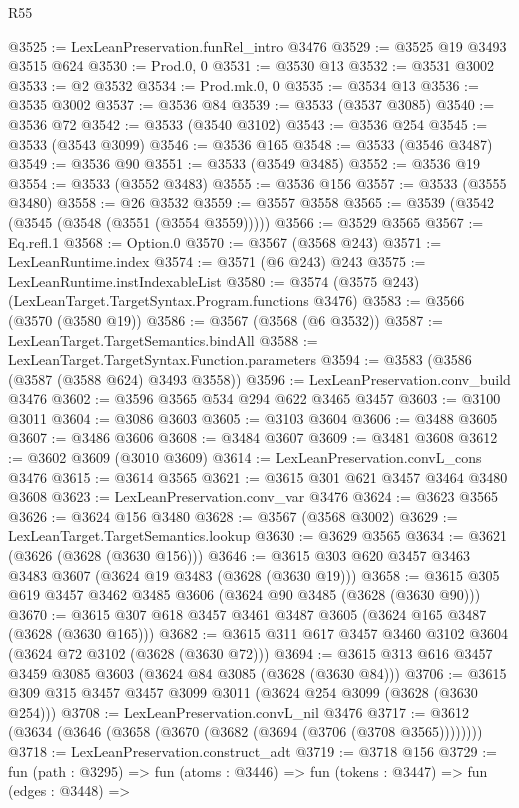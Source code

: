 \begin{lexlean}{R55}
\begin{coremodule}
@3525 := LexLeanPreservation.funRel_intro @3476
@3529 := @3525 @19 @3493 @3515 @624
@3530 := Prod.{0, 0}
@3531 := @3530 @13
@3532 := @3531 @3002
@3533 := @2 @3532
@3534 := Prod.mk.{0, 0}
@3535 := @3534 @13
@3536 := @3535 @3002
@3537 := @3536 @84
@3539 := @3533 (@3537 @3085)
@3540 := @3536 @72
@3542 := @3533 (@3540 @3102)
@3543 := @3536 @254
@3545 := @3533 (@3543 @3099)
@3546 := @3536 @165
@3548 := @3533 (@3546 @3487)
@3549 := @3536 @90
@3551 := @3533 (@3549 @3485)
@3552 := @3536 @19
@3554 := @3533 (@3552 @3483)
@3555 := @3536 @156
@3557 := @3533 (@3555 @3480)
@3558 := @26 @3532
@3559 := @3557 @3558
@3565 := @3539 (@3542 (@3545 (@3548 (@3551 (@3554 @3559)))))
@3566 := @3529 @3565
@3567 := Eq.refl.{1}
@3568 := Option.{0}
@3570 := @3567 (@3568 @243)
@3571 := LexLeanRuntime.index
@3574 := @3571 (@6 @243) @243
@3575 := LexLeanRuntime.instIndexableList
@3580 := @3574 (@3575 @243) (LexLeanTarget.TargetSyntax.Program.functions @3476)
@3583 := @3566 (@3570 (@3580 @19))
@3586 := @3567 (@3568 (@6 @3532))
@3587 := LexLeanTarget.TargetSemantics.bindAll
@3588 := LexLeanTarget.TargetSyntax.Function.parameters
@3594 := @3583 (@3586 (@3587 (@3588 @624) @3493 @3558))
@3596 := LexLeanPreservation.conv_build @3476
@3602 := @3596 @3565 @534 @294 @622 @3465 @3457
@3603 := @3100 @3011
@3604 := @3086 @3603
@3605 := @3103 @3604
@3606 := @3488 @3605
@3607 := @3486 @3606
@3608 := @3484 @3607
@3609 := @3481 @3608
@3612 := @3602 @3609 (@3010 @3609)
@3614 := LexLeanPreservation.convL_cons @3476
@3615 := @3614 @3565
@3621 := @3615 @301 @621 @3457 @3464 @3480 @3608
@3623 := LexLeanPreservation.conv_var @3476
@3624 := @3623 @3565
@3626 := @3624 @156 @3480
@3628 := @3567 (@3568 @3002)
@3629 := LexLeanTarget.TargetSemantics.lookup
@3630 := @3629 @3565
@3634 := @3621 (@3626 (@3628 (@3630 @156)))
@3646 := @3615 @303 @620 @3457 @3463 @3483 @3607 (@3624 @19 @3483 (@3628 (@3630 @19)))
@3658 := @3615 @305 @619 @3457 @3462 @3485 @3606 (@3624 @90 @3485 (@3628 (@3630 @90)))
@3670 := @3615 @307 @618 @3457 @3461 @3487 @3605 (@3624 @165 @3487 (@3628 (@3630 @165)))
@3682 := @3615 @311 @617 @3457 @3460 @3102 @3604 (@3624 @72 @3102 (@3628 (@3630 @72)))
@3694 := @3615 @313 @616 @3457 @3459 @3085 @3603 (@3624 @84 @3085 (@3628 (@3630 @84)))
@3706 := @3615 @309 @315 @3457 @3457 @3099 @3011 (@3624 @254 @3099 (@3628 (@3630 @254)))
@3708 := LexLeanPreservation.convL_nil @3476
@3717 := @3612 (@3634 (@3646 (@3658 (@3670 (@3682 (@3694 (@3706 (@3708 @3565))))))))
@3718 := LexLeanPreservation.construct_adt
@3719 := @3718 @156
@3729 := fun (path : @3295) =>
  fun (atoms : @3446) =>
  fun (tokens : @3447) =>
  fun (edges : @3448) =>

\end{coremodule}
\end{lexlean}
